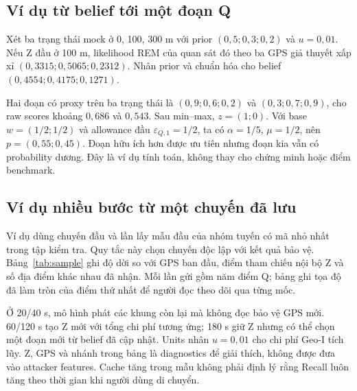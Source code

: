 \subsection{Ví dụ từ belief tới một đoạn Q}
Xét ba trạng thái mock ở 0, 100, 300 m với prior $(0{,}5;0{,}3;0{,}2)$ và $u=0{,}01$. Nếu Z đầu
ở 100 m, likelihood REM của quan sát đó theo ba GPS giả thuyết xấp xỉ $(0{,}3315;0{,}5065;0{,}2312)$.
Nhân prior và chuẩn hóa cho belief $(0{,}4554;0{,}4175;0{,}1271)$.

Hai đoạn có proxy trên ba trạng thái là $(0{,}9;0{,}6;0{,}2)$ và $(0{,}3;0{,}7;0{,}9)$, cho raw scores
khoảng $0{,}686$ và $0{,}543$. Sau min--max, $z=(1;0)$. Với base $w=(1/2;1/2)$ và allowance đầu
$\varepsilon_{Q,1}=1/2$, ta có $\alpha=1/5$, $\mu=1/2$, nên $p=(0{,}55;0{,}45)$.
Đoạn hữu ích hơn được ưu tiên nhưng đoạn kia vẫn có probability dương. Đây là ví dụ tính toán,
không thay cho chứng minh hoặc điểm benchmark.

\subsection{Ví dụ nhiều bước từ một chuyến đã lưu}
Ví dụ dùng chuyến đầu và lần lấy mẫu đầu của nhóm tuyến có mã nhỏ nhất trong tập kiểm tra. Quy tắc này chọn chuyến độc lập với kết quả bảo vệ. Bảng~\ref{tab:sample} ghi độ dời so với GPS ban đầu, điểm tham chiếu nội bộ Z và số địa điểm khác nhau đã nhận. Mỗi lần gửi gồm năm điểm Q; bảng ghi tọa độ đã làm tròn của điểm thứ nhất để người đọc theo dõi qua từng mốc.



Ở 20/40 s, mô hình phát các khung còn lại mà không đọc bảo vệ GPS mới. 60/120 s tạo Z mới với tổng
chi phí tương ứng; 180 s giữ Z nhưng có thể chọn một đoạn mới từ belief đã cập nhật. Units nhân
$u=0{,}01$ cho chi phí Geo-I tích lũy. Z, GPS và nhánh trong bảng là diagnostics để giải thích, không
được đưa vào attacker features. Cache tăng trong mẫu không phải định lý rằng Recall luôn tăng theo
thời gian khi người dùng di chuyển.



